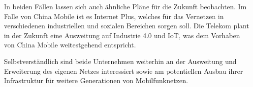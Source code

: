 In beiden Fällen lassen sich auch ähnliche Pläne für die Zukunft beobachten. Im Falle von China Mobile ist es Internet Plus, welches für das Vernetzen in verschiedenen industriellen und sozialen Bereichen sorgen soll. Die Telekom plant in der Zukunft eine Ausweitung auf Industrie 4.0 und IoT, was dem Vorhaben von China Mobile weitestgehend entspricht. 

Selbstverständlich sind beide Unternehmen weiterhin an der Ausweitung und Erweiterung des eigenen Netzes interessiert sowie am potentiellen Ausbau ihrer Infrastruktur für weitere Generationen von Mobilfunknetzen.  

\medskip



